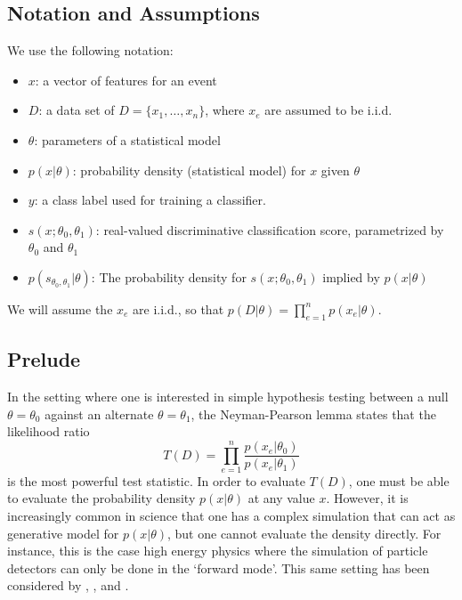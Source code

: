 \documentclass[aoas,preprint]{imsart}
\numberwithin{equation}{section}
\theoremstyle{plain}
\begin{document}
  

\subsection{Notation and Assumptions}

We use the following notation:
\begin{itemize}
 \item $x$: a vector of features for an event
 \item $D$: a data set of $D=\{x_1, \dots, x_n\}$, where $x_e$ are assumed to be i.i.d.
 \item $\theta$: parameters of a statistical model
\item $p(x| \theta)$:  probability density  (statistical model) for $x$ given $\theta$
\item $y$: a class label used for training a classifier.
\item $s(x;\theta_0, \theta_1)$: real-valued discriminative classification score, parametrized by $\theta_0$ and $\theta_1$
\item $p( s_{\theta_0, \theta_1} | \theta )$: The probability density  for $s(x; \theta_0, \theta_1)$ implied by $p(x|\theta)$ 
\end{itemize}
We will assume the $x_e$ are i.i.d., so that $p(D|\theta) = \prod_{e=1}^n p(x_e | \theta)$.

\subsection{Prelude}

In the setting where one is interested in simple hypothesis testing between a null $\theta=\theta_0$ against an alternate $\theta=\theta_1$, the Neyman-Pearson lemma states that the likelihood ratio 
\begin{equation}
T(D) = \prod_{e=1}^n \frac{ p(x_e|\theta_0)}{ p(x_e|\theta_1)}
\end{equation}
is the most powerful test statistic. In order to evaluate $T(D)$, one must be able to evaluate the probability density 
$p(x| \theta)$ at any value $x$. However, it is increasingly common in science that one has a complex simulation that 
can act as generative model  for $p(x|\theta)$, but one cannot evaluate the density directly. For instance, this is the case 
high energy physics where the simulation of particle detectors can only be done in the `forward mode'. This same setting has been considered by \cite{ClaytonScott}, \cite{JMLR:v14:tong13a}, and \cite{Neal:2007zz}.
\end{document}
